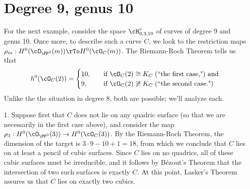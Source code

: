 %
%
%

\section{Degree 9, genus 10}\label{deg9 section}

For the next example, consider the space $\cH^\circ_{9,3,10}$ of curves of degree 9 and genus 10. Once more, to describe such a curve $C$, we look to the restriction maps $\rho_m: H^0(\cO_{\PP^3}(m)) \rTo H^0(\cO_C(m))$. The Riemann-Roch Theorem tells us that
\begin{align*}
h^0(\cO_C(2)) =
\begin{cases}
10, \quad &\text{if } \cO_C(2) \cong K_C \; \text{(``the first case,") and } \\
9,  \quad &\text{if } \cO_C(2) \not\cong K_C  \; \text{(``the second case.")}
\end{cases}
\end{align*}
Unlike the the situation in degree 8, both are possible; we'll analyze each.

1. Suppose first that $C$ does not lie on any quadric surface (so that we are necessarily in the first case above), and consider the map $\rho_3 : H^0(\cO_{\PP^3}(3)) \to H^0(\cO_C(3))$. By the Riemann-Roch Theorem, the dimension of the target is $3\cdot 9 - 10 + 1 = 18$, from which we conclude that $C$ lies on at least a pencil of cubic surfaces. Since $C$ lies on no quadrics, all of these cubic surfaces must be irreducible, and it follows by B\'ezout's Theorem that the intersection of two such surfaces is exactly $C$. At this point, Lasker's Theorem assures us that $C$ lies on exactly two cubics.


